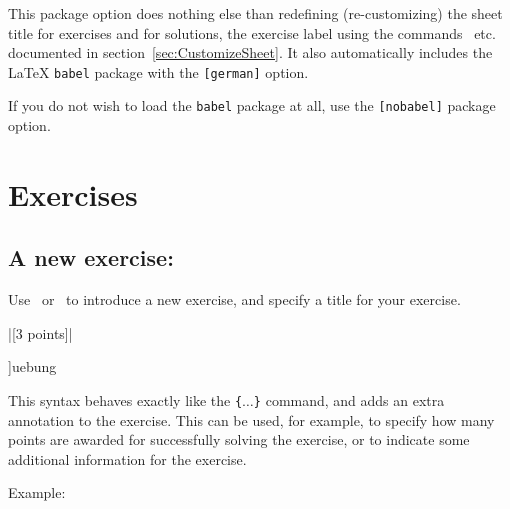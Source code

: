 \documentclass[11pt,a4paper]{article}
\begin{document}
\begin{pkgtip}
  This package option does nothing else than redefining (re-customizing) the sheet title
  for exercises and for solutions, the exercise label using the
  commands~ etc. documented in
  section~\ref{sec:CustomizeSheet}. It also automatically includes the \LaTeX{}
  \texttt{babel} package with the \texttt{[german]} option.
\end{pkgtip}


\begin{pkgtip}
  If you do not wish to load the \texttt{babel} package at all, use the \texttt{[nobabel]}
  package option.
\end{pkgtip}




\section{Exercises}

\subsection{A new exercise: }

Use~ or~ to introduce a new exercise, and specify a
title for your exercise.

\verbdef\exampleuebungannotation|[3 points]|
\def\uebungannotprototype{\{$\langle$Exercise %
  Title$\rangle$\}[$\langle$annotation$\rangle$]}
{%
\def\uebdocNoLabel{}%
\pkgcmddoc[\uebungannotprototype]{uebung}%
{ This syntax behaves exactly like the \texttt{\{$\ldots$\}} command, and
  adds an extra annotation to the exercise. This can be used, for example, to specify how
  many points are awarded for successfully solving the exercise, or to indicate some
  additional information for the exercise.

  Example: \exampleuebungannotation
}
}
\end{document}
